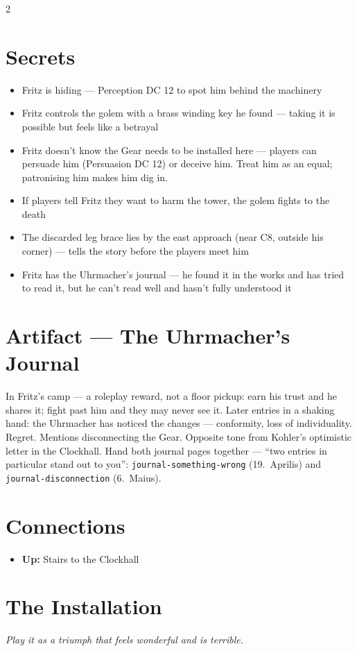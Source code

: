 \documentclass[10pt,letterpaper]{article}
\begin{document}
\begin{multicols}{2}
\section*{Secrets}
\begin{itemize}
\item Fritz is hiding --- Perception DC 12 to spot him behind the machinery
\item Fritz controls the golem with a brass winding key he found --- taking it is possible but feels like a betrayal
\item Fritz doesn't know the Gear needs to be installed here --- players can persuade him (Persuasion DC 12) or deceive him. Treat him as an equal; patronising him makes him dig in.
\item If players tell Fritz they want to harm the tower, the golem fights to the death
\item The discarded leg brace lies by the east approach (near C8, outside his corner) --- tells the story before the players meet him
\item Fritz has the Uhrmacher's journal --- he found it in the works and has tried to read it, but he can't read well and hasn't fully understood it
\end{itemize}

\section*{Artifact --- The Uhrmacher's Journal}
In Fritz's camp --- a roleplay reward, not a floor pickup: earn his trust and he shares it; fight past him and they may never see it. Later entries in a shaking hand: the Uhrmacher has noticed the changes --- conformity, loss of individuality. Regret. Mentions disconnecting the Gear. Opposite tone from Kohler's optimistic letter in the Clockhall. Hand both journal pages together --- ``two entries in particular stand out to you'': \texttt{journal-something-wrong} (19.\ Aprilis) and \texttt{journal-disconnection} (6.\ Maius).

\section*{Connections}
\begin{itemize}
\item \textbf{Up:} Stairs to the Clockhall
\end{itemize}

\section*{The Installation}
\textit{Play it as a triumph that feels wonderful and is terrible.}


\end{multicols}
\end{document}
